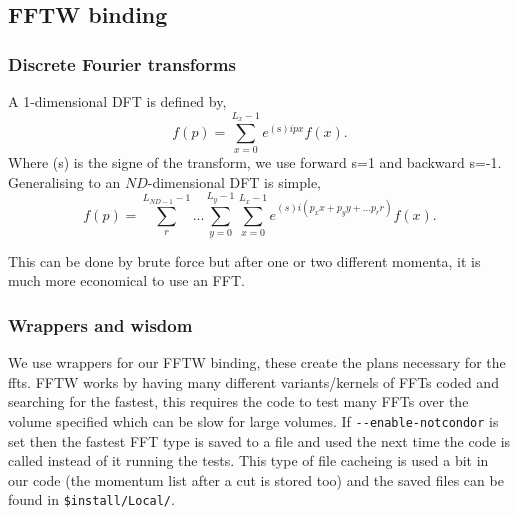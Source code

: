 \subsection{FFTW binding}

\subsubsection{Discrete Fourier transforms}

A 1-dimensional DFT is defined by,
\begin{equation}
f(p) = \sum_{x=0}^{L_x-1}e^{(\text{s})ipx}f(x).
\end{equation}
Where (s) is the signe of the transform, we use forward s=1 and backward s=-1.
Generalising to an $ND$-dimensional DFT is simple,
\begin{equation}
f(p) = \sum_r^{L_{ND-1}-1} ... \sum_{y=0}^{L_y-1} \sum_{x=0}^{L_x-1}e^{(s)i(p_x x + p_y y + ... p_r r)}f(x).
\end{equation}

This can be done by brute force but after one or two different momenta, it is
much more economical to use an FFT.

\subsubsection{Wrappers and wisdom}

We use wrappers for our FFTW binding, these create the plans necessary for the ffts.
FFTW works by having many different variants/kernels of FFTs coded and searching
for the fastest, this requires the code to test many FFTs over the volume specified
which can be slow for large volumes. If \verb|--enable-notcondor| is set then the
fastest FFT type is saved to a file and used the next time the code is called instead
of it running the tests. This type of file cacheing is used a bit in our code (the
momentum list after a cut is stored too) and the saved files can be found in 
\verb|$install/Local/|.
